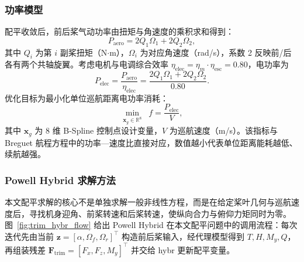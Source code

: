 \subsubsection{功率模型}

配平收敛后，前后桨气动功率由扭矩与角速度的乘积求和得到：
\begin{equation}
P_\text{aero} = 2Q_1\Omega_1 + 2Q_2\Omega_2,
\end{equation}
其中 $Q_i$ 为第 $i$ 副桨扭矩（N$\cdot$m），$\Omega_i$ 为对应角速度（rad/s），系数 2 反映前/后各有两个共轴旋翼。考虑电机与电调综合效率 $\eta_\text{elec} = \eta_m \cdot \eta_\text{esc} = 0.80$，电功率为
\begin{equation}
P_\text{elec} = \frac{P_\text{aero}}{\eta_\text{elec}} = \frac{2Q_1\Omega_1 + 2Q_2\Omega_2}{0.80}.
\end{equation}
优化目标为最小化单位巡航距离电功率消耗：
\begin{equation}
\min_{\mathbf{x}_g \in \mathbb{R}^8} \;\; f = \frac{P_\text{elec}}{V},
\end{equation}
其中 $\mathbf{x}_g$ 为 8 维 B-Spline 控制点设计变量，$V$ 为巡航速度（m/s）。该指标与 Breguet 航程方程中的功率—速度比直接对应，数值越小代表单位距离能耗越低、续航越强。

\subsubsection{Powell Hybrid 求解方法}

本文配平求解的核心不是单独求解一般非线性方程，而是在给定桨叶几何与巡航速度后，寻找机身迎角、前桨转速和后桨转速，使纵向合力与俯仰力矩同时为零。图~\ref{fig:trim_hybr_flow} 给出 Powell Hybrid 在本文配平问题中的调用流程：每次迭代先由当前 $\mathbf{z}=[\alpha,\Omega_f,\Omega_r]^\top$ 构造前后桨输入，经代理模型得到 $T,H,M_y,Q$，再组装残差 $\mathbf{F}_{\mathrm{trim}}=[F_x,F_z,M_y]^\top$ 并交给 hybr 更新配平变量。

